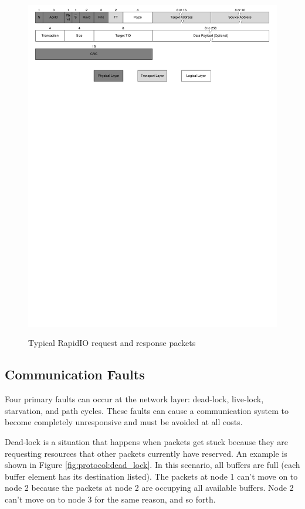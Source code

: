 \begin{landscape}
\begin{figure}[ptb]
\begin{centering}
{				\includegraphics[scale=0.9]{Protocol/Figures/protocol-rapidio_response_header.pdf}
				\label{fig:protocol:rapidio_packets:response}
			}
			\caption{Typical RapidIO request and response packets}
			\label{fig:protocol:rapidio_packets}
		\end{centering}
	\end{figure}
\end{landscape}

\subsection{Communication Faults}\label{sec:protocol:introduction:communication_faults}

Four primary faults can occur at the network layer: dead-lock, live-lock, starvation, and path cycles. These faults can cause a communication system to become completely unresponsive and must be avoided at all costs.

Dead-lock is a situation that happens when packets get stuck because they are requesting resources that other packets currently have reserved. An example is shown in Figure \ref{fig:protocol:dead_lock}. In this scenario, all buffers are full (each buffer element has its destination listed). The packets at node 1 can't move on to node 2 because the packets at node 2 are occupying all available buffers. Node 2 can't move on to node 3 for the same reason, and so forth.

